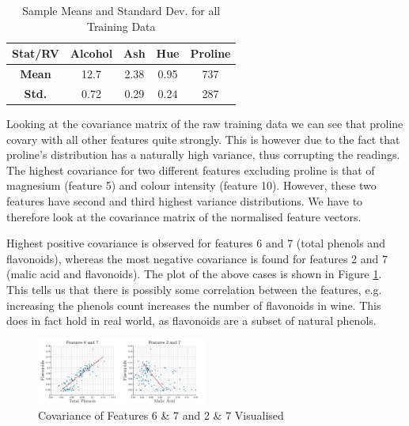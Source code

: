 \documentclass[10pt,twocolumn,letterpaper]{article}
\begin{document}
\begin{table}[H]
\caption{Sample Means and Standard Dev. for all Training Data \label{tab:statAll}}
\small
\begin{center}
\begin{tabular}{|c| c c c c|}
\hline
\bf Stat/RV & Alcohol & Ash & Hue & Proline \\ [0.5ex]
\hline
\bf Mean & 12.7 & 2.38 & 0.95 & 737 \\ [0.5ex]
\hline
\bf Std. & 0.72 & 0.29 & 0.24 & 287 \\ [0.5ex]
\hline
\end{tabular}
\end{center}
\end{table}

\vspace{-5mm}

Looking at the covariance matrix of the raw training data we can see that proline covary with all other features quite strongly. This is however due to the fact that proline's distribution has a naturally high variance, thus corrupting the readings. The highest covariance for two different features excluding proline is that of magnesium (feature 5) and colour intensity (feature 10). However, these two features have second and third highest variance distributions. We have to therefore look at the covariance matrix of the normalised feature vectors.

Highest positive covariance is observed for features 6 and 7 (total phenols and flavonoids), whereas the most negative covariance is found for features 2 and 7 (malic acid and flavonoids). The plot of the above cases is shown in Figure \ref{fig:covAll}. This tells us that there is possibly some correlation between the features, e.g. increasing the phenols count increases the number of flavonoids in wine. This does in fact hold in real world, as flavonoids are a subset of natural phenols.

\begin{figure}[H]
\centering
\includegraphics[width=0.5\textwidth]{../results/Q1_covAll}
\caption{Covariance of Features 6 \& 7 and 2 \& 7 Visualised \label{fig:covAll}}
\end{figure}

\vspace{-5mm}
\end{document}
